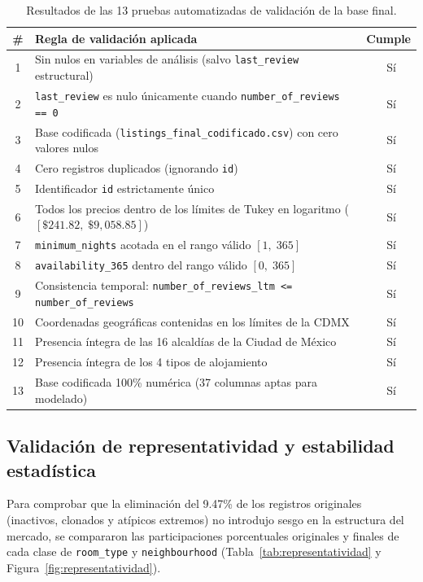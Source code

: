 \documentclass[12pt,letterpaper,oneside]{report}
\newcommand{\cmark}{\textcolor{OkGreen}{\ding{51}}}
\begin{document}
\begin{table}[htbp]
\centering
\caption{Resultados de las 13 pruebas automatizadas de validación de la base final.}
\label{tab:validacion_reglas}
\footnotesize
\renewcommand{\arraystretch}{1.12}
\begin{tabularx}{\textwidth}{c Y c}
\toprule
{}
\textbf{\#} & \textbf{Regla de validación aplicada} & \textbf{Cumple} \\
 & Sin nulos en variables de análisis (salvo \texttt{last\_review} estructural) & \cmark\ Sí \\
 2 & \texttt{last\_review} es nulo únicamente cuando \texttt{number\_of\_reviews == 0} & \cmark\ Sí \\
 3 & Base codificada (\texttt{listings\_final\_codificado.csv}) con cero valores nulos & \cmark\ Sí \\
 4 & Cero registros duplicados (ignorando \texttt{id}) & \cmark\ Sí \\
 5 & Identificador \texttt{id} estrictamente único & \cmark\ Sí \\
 6 & Todos los precios dentro de los límites de Tukey en logaritmo ($[\$241.82,\; \$9{,}058.85]$) & \cmark\ Sí \\
 7 & \texttt{minimum\_nights} acotada en el rango válido $[1,\; 365]$ & \cmark\ Sí \\
 8 & \texttt{availability\_365} dentro del rango válido $[0,\; 365]$ & \cmark\ Sí \\
 9 & Consistencia temporal: \texttt{number\_of\_reviews\_ltm <= number\_of\_reviews} & \cmark\ Sí \\
10 & Coordenadas geográficas contenidas en los límites de la CDMX & \cmark\ Sí \\
11 & Presencia íntegra de las 16 alcaldías de la Ciudad de México & \cmark\ Sí \\
12 & Presencia íntegra de los 4 tipos de alojamiento & \cmark\ Sí \\
13 & Base codificada 100\% numérica (37 columnas aptas para modelado) & \cmark\ Sí \\
\bottomrule
\end{tabularx}
\end{table}

\subsection{Validación de representatividad y estabilidad estadística}

Para comprobar que la eliminación del 9.47\% de los registros originales (inactivos, clonados y atípicos extremos) no introdujo sesgo en la estructura del mercado, se compararon las participaciones porcentuales originales y finales de cada clase de \texttt{room\_type} y \texttt{neighbourhood} (Tabla~\ref{tab:representatividad} y Figura~\ref{fig:representatividad}).
\end{document}
